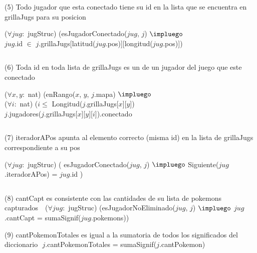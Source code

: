 \begin{Representacion}
(5) Todo jugador que esta conectado tiene su id en la lista que se encuentra en grillaJugs para su posicion  $ $\newline


($\forall jug:$ jugStruc) (esJugadorConectado($jug$, $j$) $\impluego$ \\
  $jug$.id $\in$ $j$.grillaJugs[latitud($jug$.pos)][longitud($jug$.pos)])
  
$ $\newline

(6) Toda id en toda lista de grillaJugs es un de un jugador del juego que este conectado  $ $\newline

($\forall x, y:$ nat) (enRango($x$, $y$, $j$.mapa) $\impluego$ \\
  ($\forall i:$ nat) ($i \leq$ Longitud($j$.grillaJugs[$x$][$y$]) \\
    $j$.jugadores($j$.grillaJugs[$x$][$y$][$i$]).conectado

$ $\newline

(7) iteradorAPos apunta al elemento correcto (misma id) en la lista de grillaJugs correspondiente a su pos $ $\newline

($\forall jug:$ jugStruc) ( esJugadorConectado($jug$, $j$) $\impluego$ Siguiente($jug$.iteradorAPos) = $jug$.id )

$ $\newline

(8) cantCapt es consistente con las cantidades de su lista de pokemons capturados $ $\newline
$ $\newline
($\forall jug:$ jugStruc) (esJugadorNoEliminado($jug$, $j$) $\impluego$ $jug$.cantCapt = sumaSignif($jug$.pokemons))
$ $\newline


(9) cantPokemonTotales es igual a la sumatoria de todos los significados del diccionario $ $\newline
$j$.cantPokemonTotales = sumaSignif($j$.cantPokemon)
$ $\newline


\end{Representacion}
